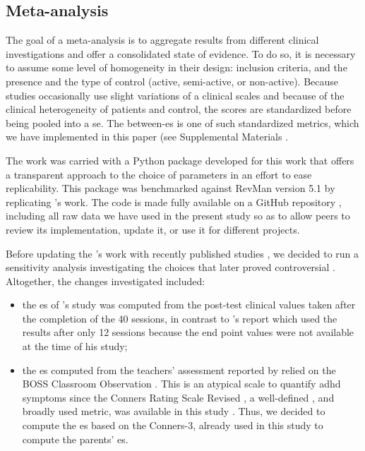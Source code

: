 \subsection{Meta-analysis}

The goal of a meta-analysis is to aggregate results from different clinical investigations and offer a 
consolidated state of evidence. To do so, it is necessary to assume 
some level of homogeneity in their design: inclusion criteria, and the presence and the type of control 
(active, semi-active, or non-active). Because studies occasionally 
use slight variations of a clinical scales and because of the clinical heterogeneity of patients and control, 
the scores are standardized before being pooled into a \gls{se}. The between-\gls{es} is one of such standardized metrics, 
which we have implemented in this paper (see Supplemental Materials \citep{Supplementalmaterial}. 

The work was carried with a Python package developed for this work that offers a transparent 
approach to the choice of parameters in an effort to ease replicability. This package was benchmarked against 
RevMan version 5.1 \citep[UK, London]{RevMan} by replicating \citet{Cortese2016}'s work. 
The code is made fully available on a GitHub repository \citep{Bussalb2018}, including all raw data we have used
in the present study so as to allow peers to review its implementation, update it, or use it for different projects. 
 
Before updating the \citet{Cortese2016}'s work with recently published studies
\citep{Strehl2017, Baumeister2016}, we decided to run a sensitivity analysis investigating the choices 
that later proved controversial \citep{Micoulaud2016}. Altogether, the changes investigated included:
\begin{itemize}
\item the \gls{es} of \citeauthor{Arnold2014}'s study was computed from the post-test clinical values taken 
after the completion of the 40 sessions, in contrast to \citet{Cortese2016}'s report which used the results 
after only 12 sessions because the end point values were not available at the time of his study;
\item the \gls{es} computed from the teachers' assessment reported by \citet{Steiner2014} relied on the BOSS 
Classroom Observation \citep{Shapiro2010}. This is an atypical scale to quantify \gls{adhd} symptoms since 
the Conners Rating Scale Revised \citep{Conners1998, Christiansen2014, Bluschke2016}, a well-defined
\citep{Collett2003, Epstein2012}, and broadly used metric, was available in this study . Thus, we decided 
to compute the \gls{es} based on the Conners-3, already used in this study to compute the 
parents' \gls{es}.  
\end{itemize} 

